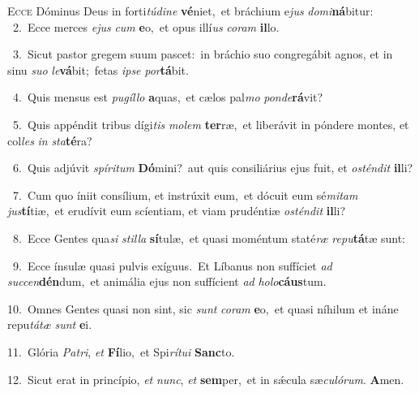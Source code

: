 \lettrine{\initial\textcolor{\initialcolor}{E}}{cce} Dóminus Deus in forti\-\textit{tú}\-\textit{di}\textit{ne} \textbf{vé}\-niet,~\star et bráchium e\textit{jus} \textit{do}\-\textit{mi}\textbf{ná}bitur:\\
{\numbfont\textcolor{\numbcolor}{~2.}}~Ecce merces \textit{e}\-\textit{jus} \textit{cum} \textbf{e}\-o,~\star et opus illí\textit{us} \textit{co}\-\textit{ram} \textbf{il}\-lo.\par
{\numbfont\textcolor{\numbcolor}{~3.}}~Sicut pastor gregem suum pascet:~\dagger in bráchio suo congregábit agnos, et in sinu \textit{su}\-\textit{o} \textit{le}\-\textbf{vá}bit;~\star fetas \textit{ip}\-\textit{se} \textit{por}\-\textbf{tá}bit.\par
{\numbfont\textcolor{\numbcolor}{~4.}}~Quis mensus est \textit{pu}\-\textit{gíl}\textit{lo} \textbf{a}\-quas,~\star et cælos pal\textit{mo} \textit{pon}\-\textit{de}\textbf{rá}vit?\par
{\numbfont\textcolor{\numbcolor}{~5.}}~Quis appéndit tribus dígi\textit{tis} \textit{mo}\-\textit{lem} \textbf{ter}\-ræ,~\star et liberávit in póndere montes, et col\textit{les} \textit{in} \textit{sta}\-\textbf{té}ra?\par
{\numbfont\textcolor{\numbcolor}{~6.}}~Quis adjúvit \textit{spí}\-\textit{ri}\textit{tum} \textbf{Dó}\-mini?~\star aut quis consiliárius ejus fuit, et \textit{os}\-\textit{tén}\textit{dit} \textbf{il}\-li?\par
{\numbfont\textcolor{\numbcolor}{~7.}}~Cum quo íniit consílium, et instrúxit eum,~\dagger et dócuit eum sé\-\textit{mi}\-\textit{tam} \textit{jus}\-\textbf{tí}tiæ,~\star et erudívit eum scíentiam, et viam prudéntiæ \textit{os}\-\textit{tén}\textit{dit} \textbf{il}\-li?\par
{\numbfont\textcolor{\numbcolor}{~8.}}~Ecce Gentes qua\textit{si} \textit{stil}\-\textit{la} \textbf{sí}\-tulæ,~\star et quasi moméntum staté\textit{ræ} \textit{re}\-\textit{pu}\textbf{tá}tæ sunt:\par
{\numbfont\textcolor{\numbcolor}{~9.}}~Ecce ínsulæ quasi pulvis exíguus.~\dagger Et Líbanus non suffíciet \textit{ad} \textit{suc}\-\textit{cen}\textbf{dén}dum,~\star et animália ejus non suffícient \textit{ad} \textit{ho}\-\textit{lo}\textbf{cáus}tum.\par
{\numbfont\textcolor{\numbcolor}{10.}}~Omnes Gentes quasi non sint, sic \textit{sunt} \textit{co}\-\textit{ram} \textbf{e}\-o,~\star et quasi níhilum et ináne repu\-\textit{tá}\-\textit{tæ} \textit{sunt} \textbf{e}\-i.\par
{\numbfont\textcolor{\numbcolor}{11.}}~Glória \textit{Pa}\-\textit{tri}, \textit{et} \textbf{Fí}\-lio,~\star et Spi\-\textit{rí}\-\textit{tu}\textit{i} \textbf{Sanc}\-to.\par
{\numbfont\textcolor{\numbcolor}{12.}}~Sicut erat in princípio, \textit{et} \textit{nunc}\-, \textit{et} \textbf{sem}\-per,~\star et in sǽcula sæ\-\textit{cu}\-\textit{ló}\textit{rum}. \textbf{A}\-men.\par
